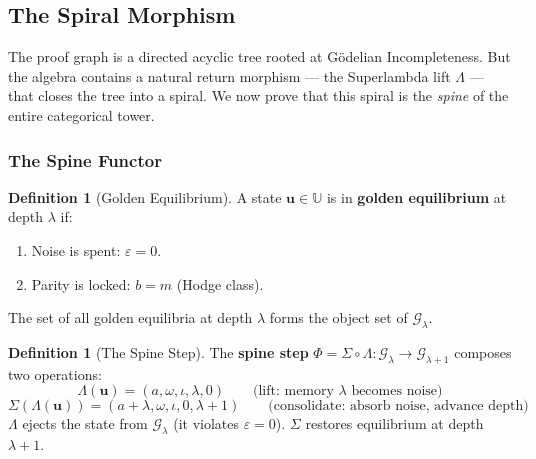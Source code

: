 \documentclass[12pt,oneside]{article}
\theoremstyle{principia}
\theoremstyle{definition}
\newtheorem{definition}[theorem]{Definition}
\theoremstyle{remark}
\providecommand{\UU}{\mathbb{U}}
\providecommand{\GG}{\mathcal{G}}
\providecommand{\eps}{\varepsilon}
\providecommand{\lam}{\lambda}
\begin{document}
\subsection{The Spiral Morphism}

The proof graph is a directed acyclic tree rooted at G\"odelian Incompleteness. But the algebra contains a natural return morphism --- the Superlambda lift $\Lambda$ --- that closes the tree into a spiral. We now prove that this spiral is the \emph{spine} of the entire categorical tower.

\subsubsection*{The Spine Functor}

\begin{definition}[Golden Equilibrium]\label{def:golden-eq}
A state $\mathbf{u} \in \UU$ is in \textbf{golden equilibrium} at depth $\lam$ if:
\begin{enumerate}
\item Noise is spent: $\eps = 0$.
\item Parity is locked: $b = m$ (Hodge class).
\end{enumerate}
The set of all golden equilibria at depth $\lam$ forms the object set of $\GG_\lam$.
\end{definition}

\begin{definition}[The Spine Step]\label{def:spine}
The \textbf{spine step} $\Phi = \Sigma \circ \Lambda : \GG_\lam \to \GG_{\lam+1}$ composes two operations:
$$\Lambda(\mathbf{u}) = (a, \omega, \iota, \lam, 0) \qquad \text{(lift: memory $\lam$ becomes noise)}$$
$$\Sigma(\Lambda(\mathbf{u})) = (a + \lam, \omega, \iota, 0, \lam + 1) \qquad \text{(consolidate: absorb noise, advance depth)}$$
$\Lambda$ ejects the state from $\GG_\lam$ (it violates $\eps = 0$). $\Sigma$ restores equilibrium at depth $\lam + 1$.
\end{definition}
\end{document}
